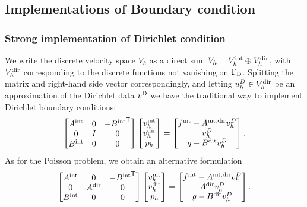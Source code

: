 \subsection{Implementations of Boundary condition}\label{subsec:}
%
%
\subsubsection{Strong implementation of Dirichlet condition}
%
We write the discrete velocity space $V_h$ as a direct sum $V_h = {V}^{\rm int}_h \oplus {V}^{\rm dir}_h$, with ${V}^{\rm dir}_h$ corresponding to the discrete functions not vanishing on $\Gamma_{\rm D}$. 
Splitting the matrix and right-hand side vector correspondingly, and letting $u^D_h\in {V}^{\rm dir}_h$ be an approximation of the Dirichlet data $v^{\rm D}$ we have the traditional way to implement Dirichlet boundary conditions:
%
\begin{equation}\label{eq:StokesDirTrad}
\begin{bmatrix}
{A}^{\rm int} & 0 & -{{B}^{\rm int}}^{\mathsf{T}}\\
0 & I & 0 \\
{B}^{\rm int} & 0 & 0
\end{bmatrix}
\begin{bmatrix}
{v}^{\rm int}_h\\
{v}^{\rm dir}_h\\
p_h
\end{bmatrix}
=
\begin{bmatrix}
{f}^{\rm int} - {A}^{\rm int, dir} v^D_h\\
v^D_h\\
g - {B}^{\rm dir} v^D_h
\end{bmatrix}.
\end{equation}
%
As for the Poisson problem, we obtain an alternative formulation   
%
\begin{equation}\label{eq:StokesDirNew}
\begin{bmatrix}
{A}^{\rm int} & 0 & -{{B}^{\rm int}}^{\mathsf{T}}\\
0 & {A}^{\rm dir} & 0 \\
{B}^{\rm int} & 0 & 0
\end{bmatrix}
\begin{bmatrix}
{v}^{\rm int}_h\\
{v}^{\rm dir}_h\\
p_h
\end{bmatrix}
=
\begin{bmatrix}
{f}^{\rm int} - {A}^{\rm int, dir} v^D_h\\
{A}^{\rm dir} v^D_h\\
g - {B}^{\rm dir} v^D_h
\end{bmatrix}.
\end{equation}
%
%
